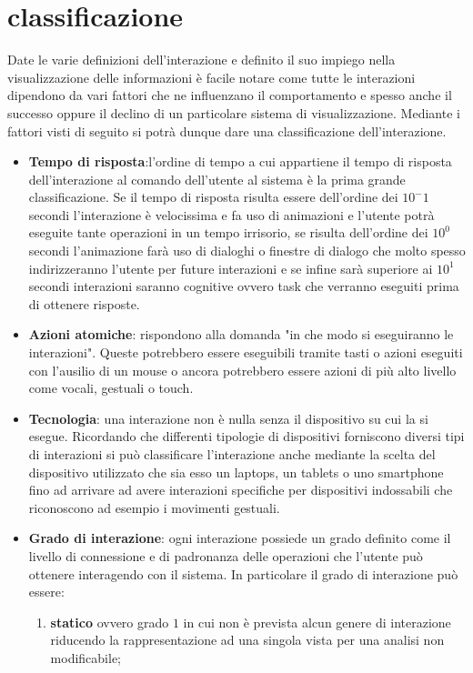 {\section{classificazione}
Date le varie definizioni dell'interazione e definito il suo impiego nella visualizzazione delle informazioni è facile notare come tutte le interazioni dipendono da vari fattori che ne influenzano il comportamento e spesso anche il successo oppure il declino di un particolare sistema di visualizzazione.
Mediante i fattori visti di seguito si potrà dunque dare una classificazione dell'interazione.
\begin{itemize}
	\item \textbf{Tempo di risposta}:l'ordine di tempo a cui appartiene il tempo di risposta dell'interazione al comando dell'utente al sistema è la prima grande classificazione. Se il tempo di risposta risulta essere dell'ordine  dei $10^-1$ secondi l’interazione è velocissima e fa uso di animazioni e l'utente potrà eseguite tante operazioni in un tempo irrisorio, se risulta dell'ordine dei $10^0$ secondi l'animazione farà uso di dialoghi o finestre di dialogo che molto spesso indirizzeranno l'utente per future interazioni e se infine sarà superiore ai $10^1$ secondi interazioni saranno cognitive ovvero task che verranno eseguiti prima di ottenere risposte.
	\item \textbf{Azioni atomiche}: rispondono alla domanda "in che modo si eseguiranno le interazioni". Queste potrebbero essere eseguibili tramite tasti o azioni eseguiti con l'ausilio di un mouse o ancora potrebbero essere azioni di più alto livello come vocali, gestuali o touch.
	\item \textbf{Tecnologia}: una interazione non è nulla senza il dispositivo su cui la si esegue. Ricordando che differenti tipologie di dispositivi forniscono diversi tipi di interazioni si può classificare l'interazione anche mediante la scelta del dispositivo utilizzato che sia esso un laptops, un tablets o uno smartphone fino ad arrivare ad avere interazioni specifiche per dispositivi indossabili che riconoscono ad esempio i movimenti gestuali.
	\item \textbf{Grado di interazione}: ogni interazione possiede un grado definito come il livello di connessione e di padronanza delle operazioni che l'utente può ottenere interagendo con il sistema. In particolare il grado di interazione può essere:
	\begin{enumerate}
		\item \textbf{statico} ovvero grado $1$ in cui non è prevista alcun genere di interazione riducendo la rappresentazione ad una singola vista per una analisi non modificabile;

\end{enumerate}
\end{itemize}}
